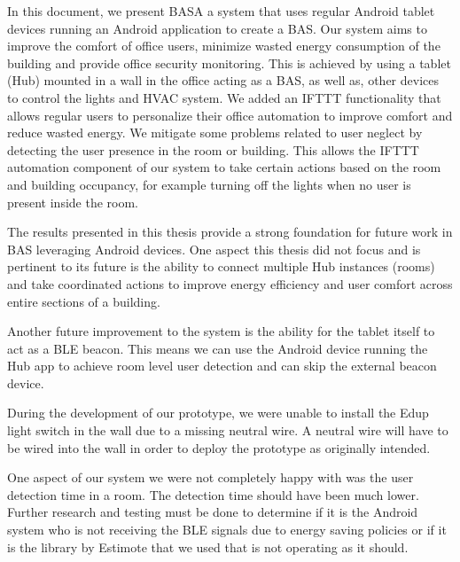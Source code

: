 \documentclass[conference]{IEEEtran}
\begin{document}
In this document, we present BASA a system that uses regular Android tablet devices running an Android application to create a \ac{BAS}. Our system aims to improve the comfort of office users, minimize wasted energy consumption of the building and provide office security monitoring. 
This is achieved by using a tablet (Hub) mounted in a wall in the office acting as a \ac{BAS}, as well as, other devices to control the lights and \ac{HVAC} system. 
We added an \ac{IFTTT} functionality that allows regular users to personalize their office automation to improve comfort and reduce wasted energy. We mitigate some problems related to user neglect by detecting the user presence in the room or building. This allows the \ac{IFTTT} automation component of our system to take certain actions based on the room and building occupancy, for example turning off the lights when no user is present inside the room.

The results presented in this thesis provide a strong foundation for future work in \ac{BAS} leveraging Android devices. 
One aspect this thesis did not focus and is pertinent to its future is the ability to connect multiple Hub instances (rooms) and take coordinated actions to improve energy efficiency and user comfort across entire sections of a building. 

Another future improvement to the system is the ability for the tablet itself to act as a \ac{BLE} beacon. This means we can use the Android device running the Hub app to achieve room level user detection and can skip the external beacon device.

During the development of our prototype, we were unable to install the Edup light switch in the wall due to a missing neutral wire. A neutral wire will have to be wired into the wall in order to deploy the prototype as originally intended. 

One aspect of our system we were not completely happy with was the user detection time in a room. The detection time should have been much lower. Further research and testing must be done to determine if it is the Android system who is not receiving the BLE signals due to energy saving policies or if it is the library by Estimote that we used that is not operating as it should.






%
%
%
\end{document}
